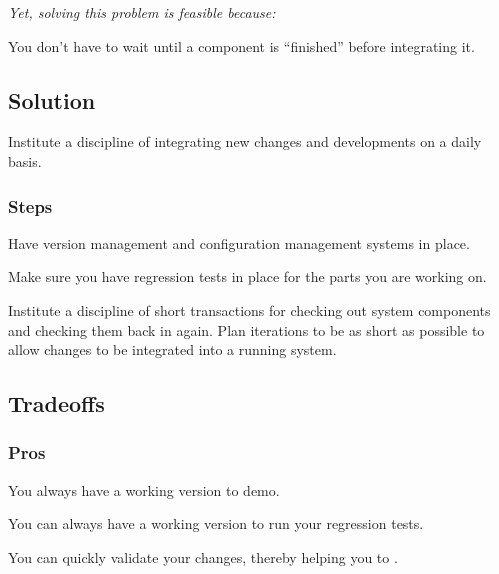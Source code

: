 \documentclass[a4paper,10pt,twoside]{book}
\begin{document}
\emph{Yet, solving this problem is feasible because:}

\begin{bulletlist}
\item You don't have to wait until a component is ``finished'' before integrating it.
\end{bulletlist}

\subsection*{Solution}

Institute a discipline of integrating new changes and developments on a daily basis.

\subsubsection*{Steps}

\begin{bulletlist}
\item Have version management and configuration management systems in place.

\item Make sure you have regression tests in place for the parts you are working on.

\item Institute a discipline of short transactions for checking out system components and checking them back in again. Plan iterations to be as short as possible to allow changes to be integrated into a running system.
\end{bulletlist}

\subsection*{Tradeoffs}

\subsubsection*{Pros}

\begin{bulletlist}
\item You always have a working version to demo.

\item You can always have a working version to run your regression tests.

\item You can quickly validate your changes, thereby helping you to .
\end{bulletlist}
\end{document}
